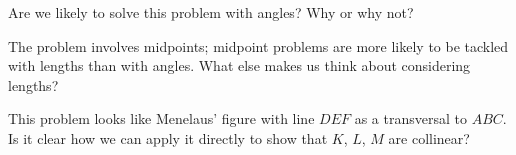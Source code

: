 Are we likely to solve this problem with angles?  Why or why not?










The problem involves midpoints; midpoint problems are more likely to be tackled with lengths than with angles.  What else makes us think about considering lengths?







This problem looks like Menelaus' figure with line $DEF$ as a transversal to $ABC$. Is it clear how we can apply it directly to show that $K$, $L$, $M$ are collinear?


